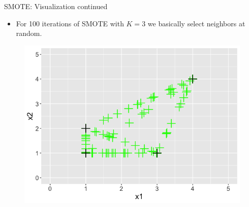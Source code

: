 \documentclass[11pt,compress,t,notes=noshow, xcolor=table]{beamer}
\begin{document}
		\begin{frame}{SMOTE: Visualization continued}
		\footnotesize
		
			\begin{itemize}
	
				\item For 100 iterations of SMOTE with $K=3$ we basically select neighbors at random.

			\end{itemize}		

			\begin{figure}
				\centering
				\includegraphics[width=0.8\linewidth]{figure_man/smote_viz_12.png}
			\end{figure}
		
	\end{frame}
		
\end{document}
